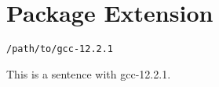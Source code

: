 
\chapter{\label{package-extension}Package Extension}
\begin{verbatim}
/path/to/gcc-12.2.1
\end{verbatim}

\par This is a sentence with gcc-12.2.1.
